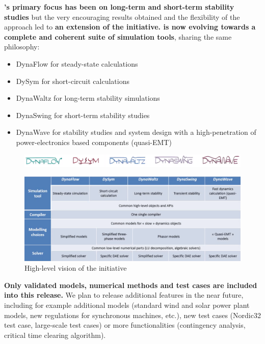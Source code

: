 \documentclass[a4paper, 12pt]{report}
\begin{document}
\textbf{\Dynawo 's primary focus has been on long-term and short-term stability studies} but the very encouraging results obtained and the flexibility of the approach led to \textbf{an extension of the initiative. \Dynawo is now evolving towards a complete and coherent suite of simulation tools}, sharing the same philosophy:
\begin{itemize}
\item DynaFlow for steady-state calculations
\item DySym for short-circuit calculations
\item DynaWaltz for long-term stability simulations
\item DynaSwing for short-term stability studies
\item DynaWave for stability studies and system design with a high-penetration of power-electronics based components (quasi-EMT)
\end{itemize}

\begin{figure}[h!]
\includegraphics[width=\textwidth]{../resources/DynawoLogos.png}
\end{figure}

\begin{figure}[h!]
\centering
\includegraphics[width=\textwidth]{../resources/DynawoInitiative.png}
\caption{High-level vision of the \Dynawo initiative}
\end{figure}

\textbf{Only validated models, numerical methods and test cases are included into this release.} We plan to release additional features in the near future, including for example additional models (standard wind and solar power plant models, new regulations for synchronous machines, etc.), new test cases (Nordic32 test case, large-scale test cases) or more functionalities (contingency analysis, critical time clearing algorithm). \\
\end{document}
